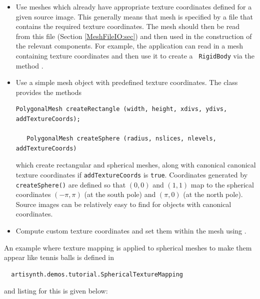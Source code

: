 \begin{itemize}

\item Use meshes which already have appropriate texture coordinates
defined for a given source image. This generally means that mesh is
specified by a file that contains the required texture coordinates.
The mesh should then be read from this file (Section
\ref{MeshFileIO:sec}) and then used in the construction of the
relevant components. For example, the application can read in a mesh
containing texture coordinates and then use it to create a {\tt
RigidBody} via the method
.

\item Use a simple mesh object with predefined
texture coordinates. The class 
provides the methods
%
\begin{lstlisting}[]
   PolygonalMesh createRectangle (width, height, xdivs, ydivs, addTextureCoords);
  
   PolygonalMesh createSphere (radius, nslices, nlevels, addTextureCoords)
\end{lstlisting}
%
which create rectangular and spherical meshes, along with canonical
canonical texture coordinates if {\tt addTextureCoords} is {\tt true}.
Coordinates generated by {\tt createSphere()} are defined so that
$(0,0)$ and $(1,1)$ map to the spherical coordinates $(-\pi,\pi)$ (at
the south pole) and $(\pi,0)$ (at the north pole). Source images can
be relatively easy to find for objects with canonical coordinates.

\item Compute custom texture coordinates and set them within the mesh
using .

\end{itemize}

An example where texture mapping is applied to spherical meshes to
make them appear like tennis balls is defined in
%
\begin{verbatim}
  artisynth.demos.tutorial.SphericalTextureMapping
\end{verbatim}
%
and listing for this is given below:

